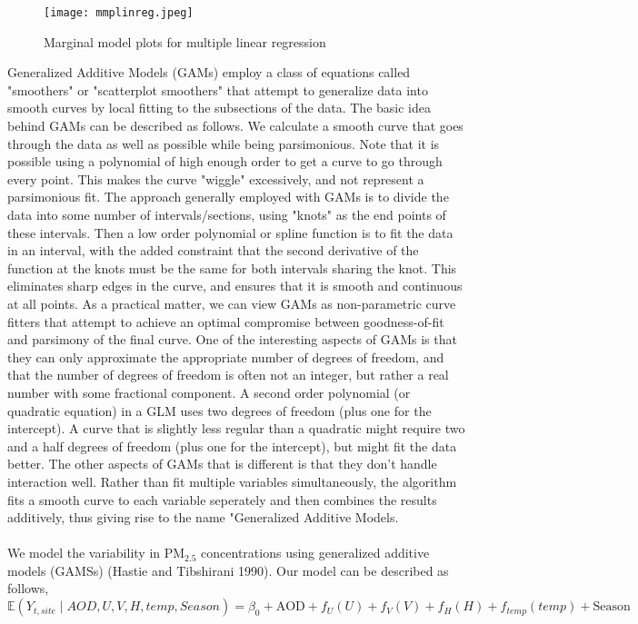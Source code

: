 \documentclass[10pt]{article}
\def\PM{{\mathrm{PM_{2.5}}}}
\begin{document}
\begin{figure}[H]
\centering 
\texttt{[image: mmplinreg.jpeg]}
\caption{Marginal model plots for multiple linear regression}
\end{figure}

Generalized Additive Models (GAMs) employ a class of equations called "smoothers" or "scatterplot smoothers" that attempt to generalize data into smooth curves by local fitting to the subsections of the data. The basic idea behind GAMs can be described as follows. We calculate a smooth curve that goes through the data as well as possible while being parsimonious. Note that it is possible using a polynomial of high enough order to get a curve to go through every point. This makes the curve "wiggle" excessively, and not represent a parsimonious fit. The approach generally employed with GAMs is to divide the data into some number of intervals/sections, using "knots" as the end points of these intervals. Then a low order polynomial or spline function is to fit the data in an interval, with the added constraint that the second derivative of the function at the knots must be the same for both intervals sharing the knot. This eliminates sharp edges in the curve, and ensures that it is smooth and continuous at all points. As a practical matter, we can view GAMs as non-parametric curve fitters that attempt to achieve an optimal compromise between goodness-of-fit and parsimony of the final curve. One of the interesting aspects of GAMs is that they can only approximate the appropriate number of degrees of freedom, and that the number of degrees of freedom is often not an integer, but rather a real number with some fractional component. A second order polynomial (or quadratic equation) in a GLM uses two degrees of freedom (plus one for the intercept). A curve that is slightly less regular than a quadratic might require two and a half degrees of freedom (plus one for the intercept), but might fit the data better. The other aspects of GAMs that is different is that they don't handle interaction well. Rather than fit multiple variables simultaneously, the algorithm fits a smooth curve to each variable seperately and then combines the results additively, thus giving rise to the name "Generalized Additive Models. \\ \\
We model the variability in $\PM$ concentrations using generalized additive models (GAMSs) (Hastie and Tibshirani 1990). Our model can be described as follows, 
\begin{equation} 
{\mathbb{E}}(Y_{t,site} \mid AOD, U, V, H, temp, Season) = \beta_0 + \text{AOD} + f_{U}(U) + f_{V}(V) + f_{H}(H) + f_{temp}(temp) + \text{Season}  
\end{equation} 
\end{document}
